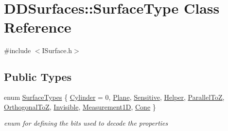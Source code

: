 \hypertarget{class_d_d_surfaces_1_1_surface_type}{}\section{D\+D\+Surfaces\+:\+:Surface\+Type Class Reference}
\label{class_d_d_surfaces_1_1_surface_type}


{\ttfamily \#include $<$I\+Surface.\+h$>$}

\subsection*{Public Types}
\begin{DoxyCompactItemize}
\item 
enum \hyperlink{class_d_d_surfaces_1_1_surface_type_a2e946294c5368a34e227be2b17e73051}{Surface\+Types} \{ \newline
\hyperlink{class_d_d_surfaces_1_1_surface_type_a2e946294c5368a34e227be2b17e73051ab7a40aada670ad2c3f61c4c084c996da}{Cylinder} = 0, 
\hyperlink{class_d_d_surfaces_1_1_surface_type_a2e946294c5368a34e227be2b17e73051ac902bc6c754d9eaeb6a128c484340990}{Plane}, 
\hyperlink{class_d_d_surfaces_1_1_surface_type_a2e946294c5368a34e227be2b17e73051a6a5514feab587af0484629aef829554e}{Sensitive}, 
\hyperlink{class_d_d_surfaces_1_1_surface_type_a2e946294c5368a34e227be2b17e73051aaff4ff1e06b875aa08183a72f7b1812d}{Helper}, 
\newline
\hyperlink{class_d_d_surfaces_1_1_surface_type_a2e946294c5368a34e227be2b17e73051aedf49a5300dce095439f45b9390faa5f}{Parallel\+ToZ}, 
\hyperlink{class_d_d_surfaces_1_1_surface_type_a2e946294c5368a34e227be2b17e73051ac72842b667410b4ce6e55451902460ee}{Orthogonal\+ToZ}, 
\hyperlink{class_d_d_surfaces_1_1_surface_type_a2e946294c5368a34e227be2b17e73051ad16cb6c378827ded354b01c281dad9e7}{Invisible}, 
\hyperlink{class_d_d_surfaces_1_1_surface_type_a2e946294c5368a34e227be2b17e73051ac1b5b1e22bd7fa94faa46fd4bc03904d}{Measurement1D}, 
\newline
\hyperlink{class_d_d_surfaces_1_1_surface_type_a2e946294c5368a34e227be2b17e73051a6c977d222ddf332875c75f8e1eab4fcf}{Cone}
 \}\begin{DoxyCompactList}\small\item\em enum for defining the bits used to decode the properties \end{DoxyCompactList}
\end{DoxyCompactItemize}
